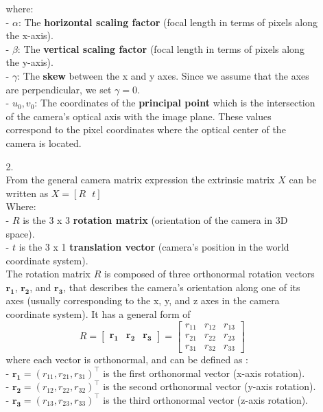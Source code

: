 \documentclass[12pt]{report}
\begin{document}
\begin{enumerate}
\begin{enumerate}
    where:\\
    - \( \alpha \): The \textbf{horizontal scaling factor} (focal length in terms of pixels along the x-axis).\\
    - \( \beta \): The \textbf{vertical scaling factor} (focal length in terms of pixels along the y-axis).\\
    - \( \gamma \): The \textbf{skew} between the x and y axes. Since we assume that the axes are perpendicular, we set \( \gamma = 0 \).\\
    - \( u_0, v_0 \): The coordinates of the \textbf{principal point} which is the intersection of the camera's optical axis with the image plane. These values correspond 
    to the pixel coordinates where the optical center of the camera is located.

    
    \item[2.]
    \ \\
    From the general camera matrix expression the extrinsic matrix $X$ can be written as $X = [R \ \ \  t]$ \\
    Where:\\
    - \( R \) is the  3 x 3 \textbf{rotation matrix} (orientation of the camera in 3D space).\\
    - \( t \) is the  3 x 1 \textbf{translation vector} (camera's position in the world coordinate system).\\

    The rotation matrix \( R \) is composed of three orthonormal rotation vectors \( \mathbf{r_1} \), \( \mathbf{r_2} \), and \( \mathbf{r_3} \), that describes the camera's 
    orientation along one of its axes (usually corresponding to the x, y, and z axes in the camera coordinate system). It has a general form of 
    $$
    R = \begin{bmatrix}
    \mathbf{r_1} & \mathbf{r_2} & \mathbf{r_3}
    \end{bmatrix}
    =
    \begin{bmatrix}
    r_{11} & r_{12} & r_{13} \\
    r_{21} & r_{22} & r_{23} \\
    r_{31} & r_{32} & r_{33}
    \end{bmatrix}
    $$
    where each vector is orthonormal, and can be defined as : \\
    - \( \mathbf{r_1} = (r_{11}, r_{21}, r_{31})^\top \) is the first orthonormal vector (x-axis rotation). \\
    - \( \mathbf{r_2} = (r_{12}, r_{22}, r_{32})^\top \) is the second orthonormal vector (y-axis rotation). \\
    - \( \mathbf{r_3} = (r_{13}, r_{23}, r_{33})^\top \) is the third orthonormal vector (z-axis rotation). \\


\end{enumerate}
\end{enumerate}
\end{document}
